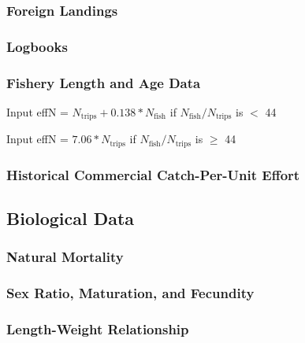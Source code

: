 \documentclass[12pt,]{article}
\begin{document}
\subsubsection{Foreign Landings}\label{foreign-landings}

\subsubsection{Logbooks}\label{logbooks}

\subsubsection{Fishery Length and Age
Data}\label{fishery-length-and-age-data}

\begin{centering}

Input effN = $N_{\text{trips}} + 0.138 * N_{\text{fish}}$ if $N_{\text{fish}}/N_{\text{trips}}$ is $<$ 44

Input effN = $7.06 * N_{\text{trips}}$ if $N_{\text{fish}}/N_{\text{trips}}$ is $\geq$ 44

\end{centering}

\subsubsection{Historical Commercial Catch-Per-Unit
Effort}\label{historical-commercial-catch-per-unit-effort}

\subsection{Biological Data}\label{biological-data}

\subsubsection{Natural Mortality}\label{natural-mortality}

\subsubsection{Sex Ratio, Maturation, and
Fecundity}\label{sex-ratio-maturation-and-fecundity}

\subsubsection{Length-Weight
Relationship}\label{length-weight-relationship}
\end{document}
